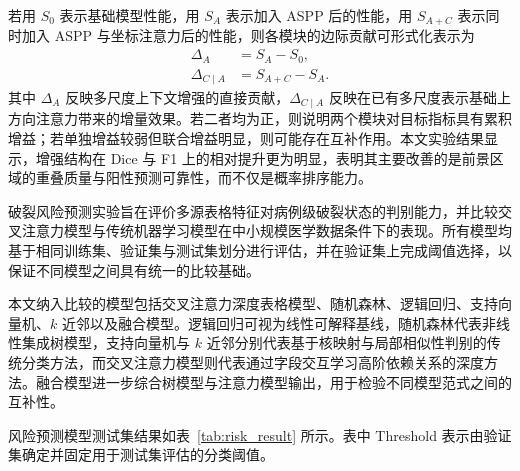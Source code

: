 若用 $S_0$ 表示基础模型性能，用 $S_A$ 表示加入 ASPP 后的性能，用 $S_{A+C}$ 表示同时加入 ASPP 与坐标注意力后的性能，则各模块的边际贡献可形式化表示为
\begin{align}
\Delta_{A} &= S_A-S_0,\\
\Delta_{C\mid A} &= S_{A+C}-S_A.
\end{align}
其中 $\Delta_A$ 反映多尺度上下文增强的直接贡献，$\Delta_{C\mid A}$ 反映在已有多尺度表示基础上方向注意力带来的增量效果。若二者均为正，则说明两个模块对目标指标具有累积增益；若单独增益较弱但联合增益明显，则可能存在互补作用。本文实验结果显示，增强结构在 Dice 与 F1 上的相对提升更为明显，表明其主要改善的是前景区域的重叠质量与阳性预测可靠性，而不仅是概率排序能力。

破裂风险预测实验旨在评价多源表格特征对病例级破裂状态的判别能力，并比较交叉注意力模型与传统机器学习模型在中小规模医学数据条件下的表现。所有模型均基于相同训练集、验证集与测试集划分进行评估，并在验证集上完成阈值选择，以保证不同模型之间具有统一的比较基础。

本文纳入比较的模型包括交叉注意力深度表格模型、随机森林、逻辑回归、支持向量机、$k$ 近邻以及融合模型。逻辑回归可视为线性可解释基线，随机森林代表非线性集成树模型，支持向量机与 $k$ 近邻分别代表基于核映射与局部相似性判别的传统分类方法，而交叉注意力模型则代表通过字段交互学习高阶依赖关系的深度方法。融合模型进一步综合树模型与注意力模型输出，用于检验不同模型范式之间的互补性。

风险预测模型测试集结果如表~\ref{tab:risk_result} 所示。表中 Threshold 表示由验证集确定并固定用于测试集评估的分类阈值。

\begin{table}[htbp]
\centering
\caption{风险预测模型测试集对比结果}
\label{tab:risk_result}
\small
\setlength{\tabcolsep}{4pt}
\normalsize
\end{table}


